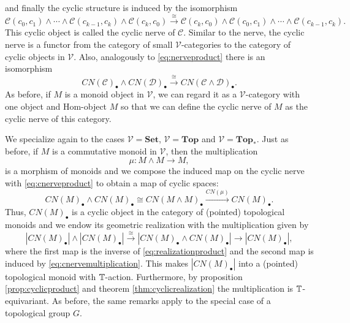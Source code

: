 and finally the cyclic structure is induced by the isomorphism
\[
\mathcal{C}(c_0,c_1)\wedge \cdots \wedge \mathcal{C}(c_{k-1}, c_k)\wedge \mathcal{C}(c_k, c_0)
\xrightarrow{\cong} \mathcal{C}(c_k, c_0) \wedge \mathcal{C}(c_0,c_1)\wedge \cdots \wedge \mathcal{C}(c_{k-1}, c_k).
\]
This cyclic object is called the cyclic nerve of $\mathcal{C}$. 
Similar to the nerve, the cyclic nerve is a functor from the category
of small $\mathcal{V}$-categories to the category of cyclic objects in $\mathcal{V}$. Also,
analogously to \eqref{eq:nerveproduct} there is an isomorphism
\begin{equation}\label{eq:cnerveproduct}
CN(\mathcal{C})_\bullet \wedge CN(\mathcal{D})_\bullet
\xrightarrow{\cong} CN(\mathcal{C} \wedge \mathcal{D})_\bullet.
\end{equation}
As before, if $M$ is a monoid object in $\mathcal{V}$, we can regard
it as a $\mathcal{V}$-category with one object and Hom-object
$M$ so that we can define the cyclic nerve of $M$
as the cyclic nerve of this category.

We specialize again to the cases $\mathcal{V} = \mathbf{Set}$, $\mathcal{V} = \mathbf{Top}$
and $\mathcal{V} = \mathbf{Top}_\ast$.
Just as before, if $M$ is a commutative  monoid in $\mathcal{V}$, then the multiplication
$$\mu:M\wedge M\to M,$$
is a morphism of monoids and we compose the induced map on the cyclic nerve with 
\eqref{eq:cnerveproduct} to obtain a map of cyclic spaces:
\begin{equation}\label{eq:cnervemultiplication}
CN(M)_\bullet\wedge CN(M)_\bullet\cong CN(M\wedge M )_\bullet
\xrightarrow{CN(\mu)}
CN(M)_\bullet.
\end{equation}
Thus, $CN(M)_\bullet$ is a cyclic object in the category of (pointed) topological monoids
and we endow its geometric realization with the multiplication given by
$$|CN(M)_\bullet| \wedge |CN(M)_\bullet| \xrightarrow{\cong}
|CN(M)_\bullet \wedge CN(M)_\bullet|\to |CN(M)_\bullet|,$$
where the first map is the inverse of \eqref{eq:realizationproduct} and the second map
is induced by \eqref{eq:cnervemultiplication}. This makes $|CN(M)_\bullet|$
into a (pointed) topological monoid with $\mathbb{T}$-action. Furthermore, by
proposition \ref{prop:cyclicproduct} and theorem \ref{thm:cyclicrealization}
the multiplication is $\mathbb{T}$-equivariant. As before, the same remarks
apply to the special case of a topological group $G$.

